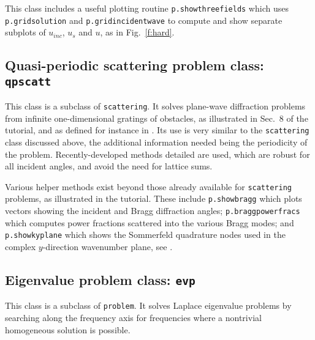 \documentclass[12pt]{article}
\begin{document}
This class includes a useful plotting routine
{\tt p.showthreefields} which uses {\tt p.gridsolution} and
{\tt p.gridincidentwave} to compute and show separate subplots of
$u_{inc}$, $u_s$ and $u$, as in Fig.~\ref{f:hard}.



\subsection{Quasi-periodic scattering problem class: {\tt qpscatt}}

This class is a subclass of {\tt scattering}.
It solves plane-wave diffraction problems from infinite one-dimensional
gratings of obstacles, as illustrated in Sec.~8 of the tutorial,
and as defined for instance in \cite{linton07}.
Its use is very similar to the {\tt scattering} class discussed above,
the additional information needed being the periodicity of the problem.
Recently-developed methods detailed \cite{qpsc} are used,
which are robust for all incident angles, and avoid the need for lattice sums.

Various helper methods exist beyond those already available for
{\tt scattering} problems, as illustrated in the tutorial.
These include
{\tt p.showbragg} which plots vectors showing the incident and Bragg
diffraction angles; {\tt p.braggpowerfracs} which computes
power fractions scattered into the various Bragg modes;
and {\tt p.showkyplane} which shows the Sommerfeld quadrature
nodes used in the complex $y$-direction wavenumber plane, see \cite{qpsc}.



\subsection{Eigenvalue problem class: {\tt evp}}

This class is a subclass of {\tt problem}.
It solves Laplace eigenvalue problems by searching along the frequency
axis for frequencies where a nontrivial homogeneous solution is possible.
\end{document}
